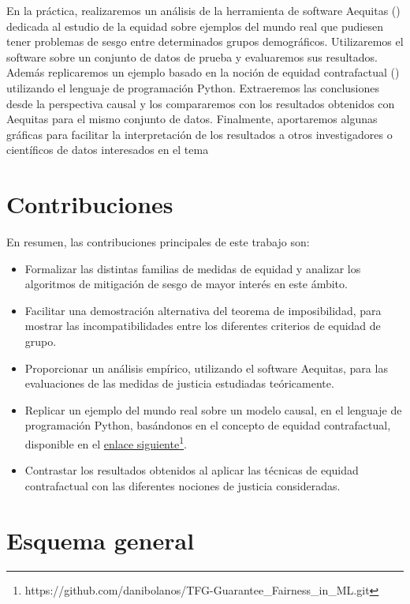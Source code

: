 \documentclass[oneside,openright,titlepage,numbers=noenddot,openany,headinclude,footinclude=true,
cleardoublepage=empty,abstractoff,BCOR=5mm,paper=a4,fontsize=12pt,main=spanish]{scrreprt}
\begin{document}
\clearpage

En la práctica, realizaremos un análisis de la herramienta de software Aequitas (\cite{aequitas2019}) dedicada al estudio de la equidad sobre ejemplos del mundo real que pudiesen tener problemas de sesgo entre determinados grupos demográficos. Utilizaremos el software sobre un conjunto de datos de prueba y evaluaremos sus resultados. Además replicaremos un ejemplo basado en la noción de equidad contrafactual (\cite{counterfactual2018}) utilizando el lenguaje de programación Python. Extraeremos las conclusiones desde la perspectiva causal y los compararemos con los resultados obtenidos con Aequitas para el mismo conjunto de datos. Finalmente, aportaremos algunas gráficas para facilitar la interpretación de los resultados a otros investigadores o científicos de datos interesados en el tema

\section{Contribuciones}

En resumen, las contribuciones principales de este trabajo son:

\begin{itemize}
    \item Formalizar las distintas familias de medidas de equidad y analizar los algoritmos de mitigación de sesgo de mayor interés en este ámbito.
    \item Facilitar una demostración alternativa del teorema de imposibilidad, para mostrar las incompatibilidades entre los diferentes criterios de equidad de grupo.
    \item Proporcionar un análisis empírico, utilizando el software Aequitas, para las evaluaciones de las medidas de justicia estudiadas teóricamente.
    \item Replicar un ejemplo del mundo real sobre un modelo causal, en el lenguaje de programación Python, basándonos en el concepto de equidad contrafactual, disponible en el \href{https://github.com/danibolanos/TFG-Guarantee_Fairness_in_ML.git}{enlace siguiente}\footnote{https://github.com/danibolanos/TFG-Guarantee\_Fairness\_in\_ML.git}.
    \item Contrastar los resultados obtenidos al aplicar las técnicas de equidad contrafactual con las diferentes nociones de justicia consideradas.
\end{itemize}

\section{Esquema general}
\end{document}
